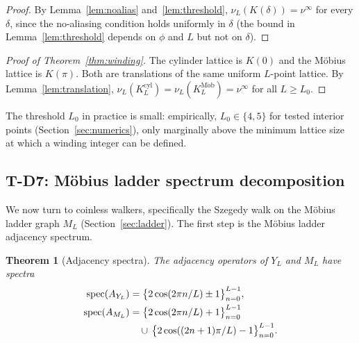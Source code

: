 \documentclass[aps,pra,reprint,amsmath,amssymb,superscriptaddress,nofootinbib,longbibliography]{revtex4-2}
\newcommand{\Mob}{\mathrm{M\ddot{o}b}}
\newcommand{\cyl}{\mathrm{cyl}}
\newtheorem{theorem}{Theorem}
\begin{document}
\begin{proof}
By Lemma~\ref{lem:noalias} and~\ref{lem:threshold}, $\nu_L(K(\delta)) = \nu^\infty$ for every $\delta$, since the no-aliasing condition holds uniformly in $\delta$ (the bound in Lemma~\ref{lem:threshold} depends on $\phi$ and $L$ but not on $\delta$).
\end{proof}

\begin{proof}[Proof of Theorem~\ref{thm:winding}]
The cylinder lattice is $K(0)$ and the M\"obius lattice is $K(\pi)$. Both are translations of the same uniform $L$-point lattice. By Lemma~\ref{lem:translation}, $\nu_L(K_L^\cyl) = \nu_L(K_L^\Mob) = \nu^\infty$ for all $L \geq L_0$.
\end{proof}

The threshold $L_0$ in practice is small: empirically, $L_0 \in \{4, 5\}$ for tested interior points (Section~\ref{sec:numerics}), only marginally above the minimum lattice size at which a winding integer can be defined.

\subsection{T-D7: M\"obius ladder spectrum decomposition}

We now turn to coinless walkers, specifically the Szegedy walk on the M\"obius ladder graph $M_L$ (Section~\ref{sec:ladder}). The first step is the M\"obius ladder adjacency spectrum.

\begin{theorem}[Adjacency spectra]
\label{thm:ladder_spectrum}
The adjacency operators of $Y_L$ and $M_L$ have spectra
\begin{align}
\mathrm{spec}(A_{Y_L}) &= \big\{2\cos(2\pi n/L) \pm 1\big\}_{n=0}^{L-1}, \\
\mathrm{spec}(A_{M_L}) &= \big\{2\cos(2\pi n/L) + 1\big\}_{n=0}^{L-1}\notag\\
&\quad\cup\, \big\{2\cos((2n+1)\pi/L) - 1\big\}_{n=0}^{L-1}.
\end{align}
\end{theorem}
\end{document}
